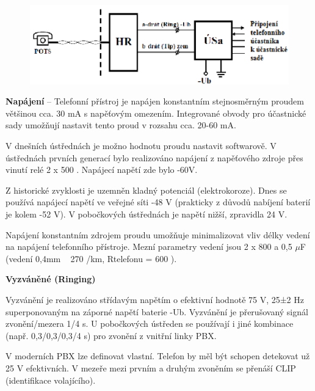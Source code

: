 \begin{figure}[h!]
    \begin{center}
        \includegraphics[width=\textwidth]{images/otazka12.png}
        \label{img:6}
    \end{center}
\end{figure}


\textbf{Napájení} -- Telefonní přístroj je napájen konstantním stejnosměrným proudem většinou cca. 30 mA s napěťovým omezením. Integrované obvody pro účastnické sady umožňují nastavit tento proud v rozsahu cca. 20-60 mA.

V dnešních ústřednách je možno hodnotu proudu nastavit softwarově. V ústřednách prvních generací bylo realizováno napájení z napěťového zdroje přes vinutí relé 2 x 500 . Napájecí napětí zde bylo -60V.

Z historické zvyklosti je uzemněn kladný potenciál (elektrokoroze). Dnes se používá napájecí napětí ve veřejné síti -48 V (prakticky z důvodů nabíjení baterií je kolem -52 V). V pobočkových ústřednách je napětí nižší, zpravidla 24 V.

Napájení konstantním zdrojem proudu umožňuje minimalizovat vliv délky vedení na napájení telefonního přístroje. Mezní parametry vedení jsou 2 x 800 a 0,5 $\mu$F (vedení 0,4mm ~ 270 /km, Rtelefonu = 600 ).


\textbf{Vyzváněné (Ringing)}

Vyzvánění je realizováno střídavým napětím o efektivní hodnotě 75 V, 25±2 Hz superponovaným na záporné napětí baterie -Ub. Vyzvánění je přerušovaný signál zvonění/mezera 1/4 s. U pobočkových ústředen se používají i jiné kombinace (např. 0,3/0,3/0,3/4 s) pro zvonění z vnitřní linky PBX.

V moderních PBX lze definovat vlastní. Telefon by měl být schopen detekovat už 25 V efektivních. V mezeře mezi prvním a druhým zvoněním se přenáší CLIP (identifikace volajícího).

